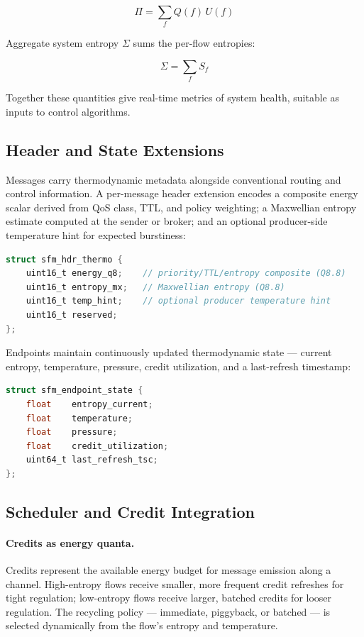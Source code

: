 \begin{equation}
\Pi = \sum_f Q(f)\, U(f)
\end{equation}

Aggregate system entropy $\Sigma$ sums the per-flow entropies:

\begin{equation}
\Sigma = \sum_f S_f
\end{equation}

Together these quantities give real-time metrics of system health, suitable as
inputs to control algorithms.

\subsection{Header and State Extensions}

Messages carry thermodynamic metadata alongside conventional routing and control
information. A per-message header extension encodes a composite energy scalar derived
from QoS class, TTL, and policy weighting; a Maxwellian entropy estimate computed at
the sender or broker; and an optional producer-side temperature hint for expected
burstiness:

\begin{lstlisting}[language=C]
struct sfm_hdr_thermo {
    uint16_t energy_q8;    // priority/TTL/entropy composite (Q8.8)
    uint16_t entropy_mx;   // Maxwellian entropy (Q8.8)
    uint16_t temp_hint;    // optional producer temperature hint
    uint16_t reserved;
};
\end{lstlisting}

Endpoints maintain continuously updated thermodynamic state --- current entropy,
temperature, pressure, credit utilization, and a last-refresh timestamp:

\begin{lstlisting}[language=C]
struct sfm_endpoint_state {
    float    entropy_current;
    float    temperature;
    float    pressure;
    float    credit_utilization;
    uint64_t last_refresh_tsc;
};
\end{lstlisting}

\subsection{Scheduler and Credit Integration}

\paragraph{Credits as energy quanta.} Credits represent the available energy budget
for message emission along a channel. High-entropy flows receive smaller, more
frequent credit refreshes for tight regulation; low-entropy flows receive larger,
batched credits for looser regulation. The recycling policy --- immediate, piggyback,
or batched --- is selected dynamically from the flow's entropy and temperature.


